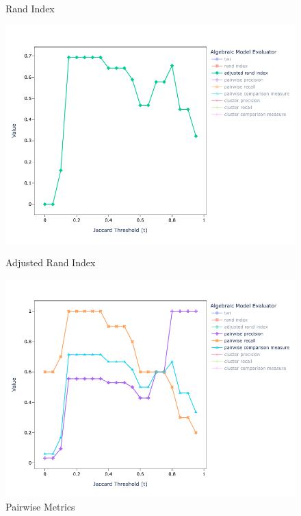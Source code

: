\documentclass[11pt]{article}
\begin{document}
\begin{figure}
\begin{minipage}{0.49\textwidth}
            \caption{Rand Index}
            \label{fig:mini-alg-rand}
        \end{minipage}    
        \begin{minipage}{0.49\textwidth}
            \centering
            \includegraphics[width=\textwidth]{mini-alg-adj-rand}
            \caption{Adjusted Rand Index}
            \label{fig:mini-alg-adj-rand}
        \end{minipage}    
        \begin{minipage}{0.49\textwidth}
            \centering
            \includegraphics[width=\textwidth]{mini-alg-pp}
            \caption{Pairwise Metrics}
            \label{fig:mini-alg-pp}
        \end{minipage}    

\end{figure}
\end{document}
